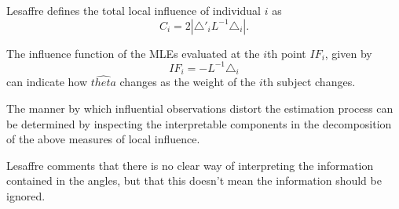 \documentclass[MAIN.tex]{subfiles}
\begin{document}
Lesaffre defines the total local influence of individual $i$ as
\begin{equation}
C_{i} = 2 | \triangle \prime _{i} L^{-1} \triangle_{i}|.
\end{equation}

The influence function of the MLEs evaluated at the $i$th point
$IF_{i}$, given by
\begin{equation}
IF_{i} = -L^{-1}\triangle _{i}
\end{equation}
can indicate how $\hat{theta}$ changes as the weight of the $i$th
subject changes.

The manner by which influential observations
distort the estimation process can be determined by inspecting the
interpretable components in the decomposition of the above
measures of local influence.


Lesaffre comments that there is no clear way of interpreting the
information contained in the angles, but that this doesn't mean
the information should be ignored.
\newpage






\end{document}
